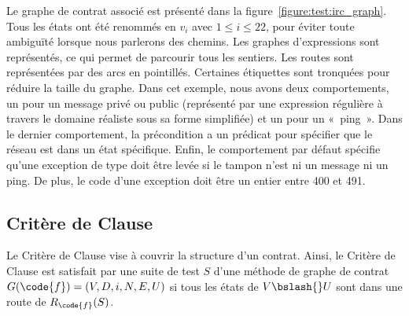 %
Le graphe de contrat associé est présenté dans la
figure~\ref{figure:test:irc_graph}. Tous les états ont été renommés en $v_i$
avec $1 \leq i \leq 22$, pour éviter toute ambiguïté lorsque nous parlerons des
chemins. Les graphes d'expressions sont représentés, ce qui permet de parcourir
tous les sentiers. Les routes sont représentées par des arcs en
pointillés. Certaines étiquettes sont tronquées pour réduire la taille du
graphe. Dans cet exemple, nous avons deux comportements, un pour un message
privé ou public (représenté par une expression régulière à travers le domaine
réaliste  sous sa forme simplifiée) et un pour un «~ping~». Dans le
dernier comportement, la précondition a un prédicat pour spécifier que le réseau
est dans un état spécifique. Enfin, le comportement par défaut spécifie qu'une
exception de type 
doit être levée si le tampon n'est ni un message ni un ping. De plus, le code
d'une exception doit être un entier entre 400 et 491.

\subsection{Critère de Clause}

Le Critère de Clause vise à couvrir la structure d'un contrat. Ainsi, le Critère
de Clause est satisfait par une suite de test $S$ d'une méthode  de
graphe de contrat $G(\code{f}) = (V, D, i, N, E, U)$ si tous les états de $V
\bslash{}U$ sont dans une route de $R_\code{f}(S)$.

